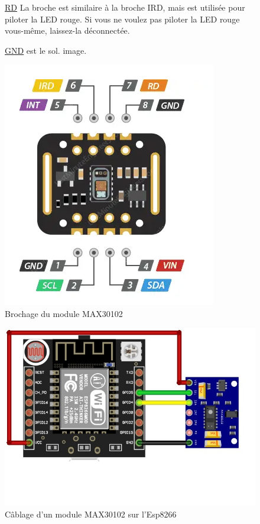 \begin{flushleft}
\begin{figure}[h]
\begin{minipage}{0.6\textwidth}
			\underline{RD} La broche est similaire à la broche IRD, mais est utilisée pour piloter la LED rouge. Si vous ne voulez pas piloter la LED rouge vous-même, laissez-la déconnectée.
			
			\underline{GND} est le sol. image.
		\end{minipage}
		\begin{minipage}{0.4\textwidth}
			\centering
			\includegraphics[width=\textwidth]{chapitres/images/Capteur8.PNG}
			\caption{Brochage du module MAX30102}
			\label{fig:votre_image}
		\end{minipage}
	\end{figure}

		\begin{figure}[h]
			\centering
			\includegraphics{chapitres/images/MAX30102-with-ESP8266.jpg}
			\caption{Câblage d’un module MAX30102 sur l'Esp8266}
			\label{fig:labelname}
		\end{figure}
\newpage

\end{flushleft}
